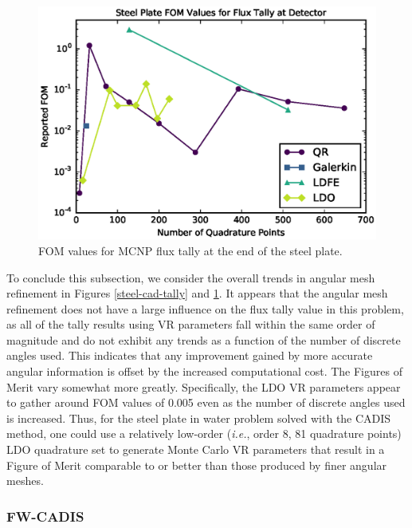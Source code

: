 \documentclass{article} %
\newcommand{\fwc}{\mbox{FW-CADIS}}
\begin{document}
\begin{figure}[!htb]
\centering
\includegraphics[max height=0.445\textheight]{steel-cadis-fom.eps}
\caption{FOM values for MCNP flux tally at the end of the steel plate.}
\label{steel-cad-fom}
\end{figure}

To conclude this subsection, we consider the overall trends in angular mesh
refinement in Figures \ref{steel-cad-tally} and \ref{steel-cad-fom}. It
appears that the angular mesh refinement does not have a large influence on the
flux tally value in this problem, as all of the tally results using VR
parameters fall within the same order of magnitude and do not exhibit any
trends as a function of the number of discrete angles used. This indicates
that any improvement gained by more accurate angular information is offset by
the increased computational cost. The Figures of Merit vary somewhat more
greatly. Specifically, the LDO VR parameters appear to gather around FOM
values of 0.005 even as the number of discrete angles used is increased. Thus,
for the steel plate in water problem solved with the CADIS method, one could
use a relatively low-order (\textit{i.e.}, order 8, 81 quadrature points) LDO
quadrature set to generate Monte Carlo VR parameters that result in a Figure
of Merit comparable to or better than those produced by finer angular meshes.

\FloatBarrier
\subsubsection{\fwc}
\end{document}
